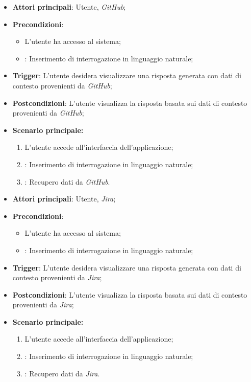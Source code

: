 \hypertarget{UC8.1}{}
\begin{itemize}
    \item \textbf{Attori principali}: Utente, \emph{GitHub};
    \item \textbf{Precondizioni}: 
    \begin{itemize}
        \item L'utente ha accesso al sistema;
        \item {}: Inserimento di interrogazione in linguaggio naturale;
    \end{itemize}
    \item \textbf{Trigger}: L'utente desidera visualizzare una risposta generata con dati di contesto provenienti da \emph{GitHub};
    \item \textbf{Postcondizioni}: L'utente visualizza la risposta basata sui dati di contesto provenienti da \emph{GitHub};
    \item \textbf{Scenario principale:}
    \begin{enumerate}
        \item L'utente accede all'interfaccia dell'applicazione;
        \item {}: Inserimento di interrogazione in linguaggio naturale;
        \item {}: Recupero dati da \emph{GitHub}.
    \end{enumerate}
\end{itemize}

\hypertarget{UC8.2}{}
\begin{itemize}
    \item \textbf{Attori principali}: Utente, \emph{Jira};
    \item \textbf{Precondizioni}: 
    \begin{itemize}
        \item L'utente ha accesso al sistema;
        \item {}: Inserimento di interrogazione in linguaggio naturale;
    \end{itemize}
    \item \textbf{Trigger}: L'utente desidera visualizzare una risposta generata con dati di contesto provenienti da \emph{Jira};
    \item \textbf{Postcondizioni}: L'utente visualizza la risposta basata sui dati di contesto provenienti da \emph{Jira};
    \item \textbf{Scenario principale:}
    \begin{enumerate}
        \item L'utente accede all'interfaccia dell'applicazione;
        \item {}: Inserimento di interrogazione in linguaggio naturale;
        \item {}: Recupero dati da \emph{Jira}.
    \end{enumerate}
\end{itemize}


